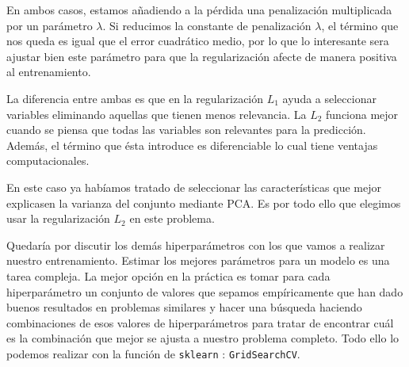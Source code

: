 \documentclass[a4paper, 20pt]{article}
\begin{document}
En ambos casos, estamos añadiendo a la pérdida una penalización multiplicada por un parámetro $\lambda$. Si reducimos la constante de penalización $\lambda$, el término que nos queda es igual que el error cuadrático medio, por lo que lo interesante sera ajustar bien este parámetro para que la regularización afecte de manera positiva al entrenamiento.

La diferencia entre ambas es que en la regularización $L_1$ ayuda a seleccionar variables eliminando aquellas que tienen menos relevancia. La $L_2$ funciona mejor cuando se piensa que todas las variables son relevantes para la predicción. Además, el término que ésta introduce es diferenciable lo cual tiene ventajas computacionales. 

En este caso ya habíamos tratado de seleccionar las características que mejor explicasen la varianza del conjunto mediante PCA. Es por todo ello que elegimos usar la regularización $L_2$ en este problema. 


Quedaría por discutir los demás hiperparámetros con los que vamos a realizar nuestro entrenamiento. Estimar los mejores parámetros para un modelo es una tarea compleja. La mejor opción en la práctica es tomar para cada hiperparámetro un conjunto de valores que sepamos empíricamente que han dado buenos resultados en problemas similares y hacer una búsqueda haciendo combinaciones de esos valores de hiperparámetros para tratar de encontrar cuál es la combinación que mejor se ajusta a nuestro problema completo. Todo ello lo podemos realizar con la función de \lstinline{sklearn} :  \lstinline{GridSearchCV}.
\end{document}
